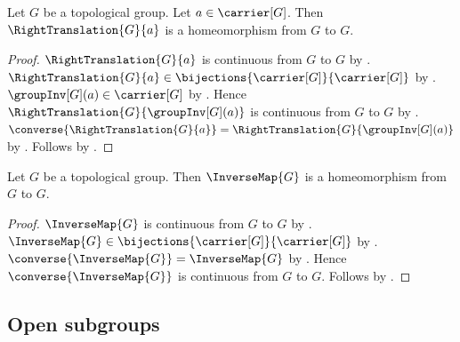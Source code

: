 \begin{theorem}\label{right_translation_homeomorphism}
    Let $G$ be a topological group.
    Let $a\in\carrier[G]$.
    Then $\RightTranslation{G}{a}$ is a homeomorphism from $G$ to $G$.
\end{theorem}
\begin{proof}
    $\RightTranslation{G}{a}$ is continuous from $G$ to $G$
        by .
    $\RightTranslation{G}{a}\in
        \bijections{\carrier[G]}{\carrier[G]}$
        by .
    $\groupInv[G](a)\in\carrier[G]$ by .
    Hence $\RightTranslation{G}{\groupInv[G](a)}$ is continuous
        from $G$ to $G$ by .
    $\converse{\RightTranslation{G}{a}}
        =\RightTranslation{G}{\groupInv[G](a)}$
        by .
    Follows by .
\end{proof}

\begin{theorem}\label{inverse_map_homeomorphism}
    Let $G$ be a topological group.
    Then $\InverseMap{G}$ is a homeomorphism from $G$ to $G$.
\end{theorem}
\begin{proof}
    $\InverseMap{G}$ is continuous from $G$ to $G$
        by .
    $\InverseMap{G}\in\bijections{\carrier[G]}{\carrier[G]}$
        by .
    $\converse{\InverseMap{G}}=\InverseMap{G}$
        by .
    Hence $\converse{\InverseMap{G}}$ is continuous from $G$ to $G$.
    Follows by .
\end{proof}

\subsection{Open subgroups}

